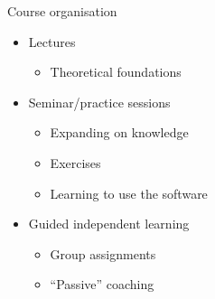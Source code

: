 \documentclass{beamer}
\begin{document}
\begin{frame}{Course organisation}

  \begin{itemize}
    \item Lectures
      \begin{itemize}
        \item Theoretical foundations
      \end{itemize}
    \item Seminar/practice sessions
      \begin{itemize}
        \item Expanding on knowledge
        \item Exercises
        \item Learning to use the software
      \end{itemize}
    \item Guided independent learning
      \begin{itemize}
        \item Group assignments
        \item ``Passive'' coaching
      \end{itemize}
  \end{itemize}
\end{frame}
\end{document}

